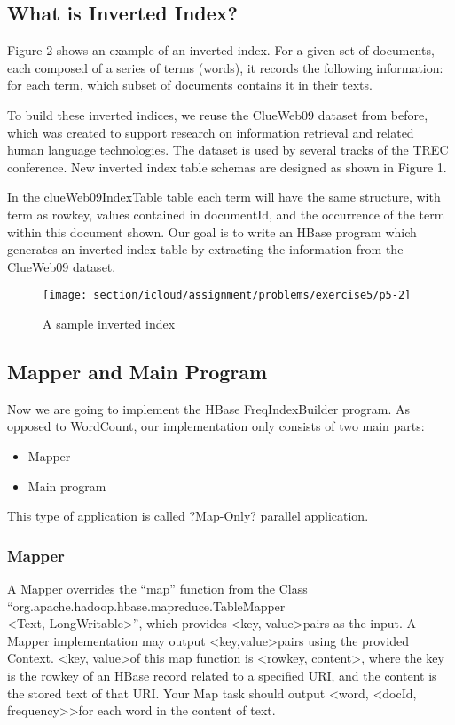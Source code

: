 \subsection*{What is Inverted Index?}
Figure 2 shows an example of an inverted index. For a given set of documents,
each composed of a series of terms (words), it records the following
information: for each term, which subset of documents contains it in their
texts.

To build these inverted indices, we reuse the ClueWeb09 dataset from before,
which was created to support research on information retrieval and related
human language technologies. The dataset is used by several tracks of the TREC
conference. New inverted index table schemas are designed as shown in Figure 1.

In the clueWeb09IndexTable table each term will have the same structure, with
term as rowkey, values contained in documentId, and the occurrence of the term
within this document shown. Our goal is to write an HBase program which
generates an inverted index table by extracting the information from the
ClueWeb09 dataset.

\begin{figure}[!htbp]
\texttt{[image: section/icloud/assignment/problems/exercise5/p5-2]}
\centering
\caption{A sample inverted index}
\end{figure}

\subsection*{Mapper and Main Program}
Now we are going to implement the HBase FreqIndexBuilder program. As opposed to
WordCount, our implementation only consists of two main parts:

\begin{itemize}
\item Mapper
\item Main program
\end{itemize}
This type of application is called ?Map-Only? parallel application.

\subsubsection*{Mapper}
A Mapper overrides the ``map'' function from the Class ``org.apache.hadoop.hbase.mapreduce.TableMapper\\
\textless Text, LongWritable\textgreater'', which provides \textless key, value\textgreater pairs as the input. A Mapper implementation may output \textless key,value\textgreater pairs using the provided Context.
\textless key, value\textgreater of this map function is \textless rowkey, content\textgreater, where the key is the rowkey of an HBase record related to a specified URI, and the content is the stored text of that URI. Your Map task should output \textless word, \textless docId, frequency\textgreater\textgreater for each word in the content of text.

